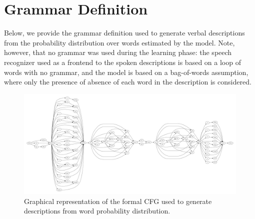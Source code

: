 \section{Grammar Definition}
Below, we provide the grammar definition used to generate verbal descriptions from the probability distribution over words estimated by the model.
Note, however, that no grammar was used during the learning phase: the speech recognizer used as a frontend to the spoken descriptions is based on a loop of words with no grammar, and the \AffWords{} model is based on a bag-of-words assumption, where only the presence of absence of each word in the description is considered.

\begin{figure}
  \includegraphics[width=\textwidth, angle=90]{figures/grammar}
  \caption{Graphical representation of the formal \ac{CFG} used to generate descriptions from word probability distribution.}
\end{figure}


